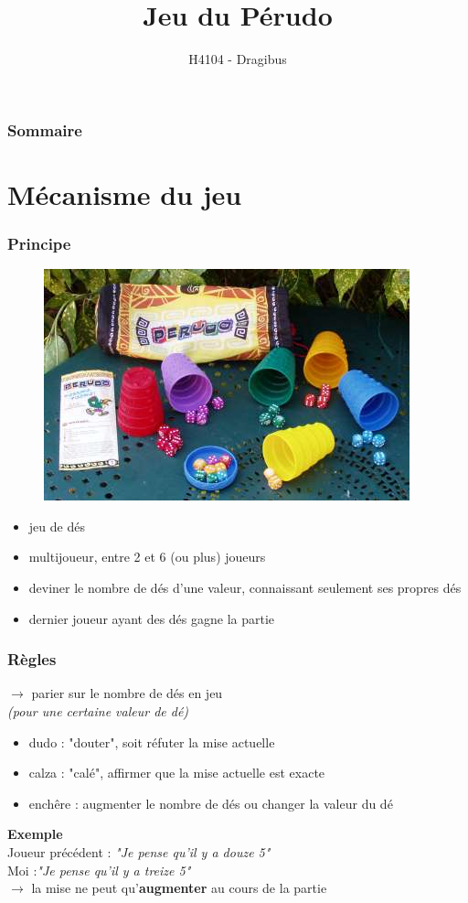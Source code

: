 \documentclass{beamer}
\title{Jeu du Pérudo}
\author{H4104 - Dragibus}
\institute{INSA de Lyon}
\begin{document}
\begin{frame}
  \titlepage
\end{frame}

\begin{frame}
  \frametitle{Sommaire}
  \tableofcontents[hideallsubsections]
\end{frame}

\section{Mécanisme du jeu}

\begin{frame}
  \frametitle{Principe}

  \begin{figure}
    \includegraphics[scale=0.4]{perudo}
  \end{figure}

  \begin{itemize}
    \item jeu de dés
    \item multijoueur, entre 2 et 6 (ou plus) joueurs
    \item deviner le nombre de dés d'une valeur, connaissant seulement ses
      propres dés
    \item dernier joueur ayant des dés gagne la partie
  \end{itemize}
\end{frame}

\begin{frame}
  \frametitle{Règles}
  $\to$ parier sur le nombre de dés en jeu \\
  \emph{(pour une certaine valeur de dé)}

  \begin{itemize}
    \item dudo : "douter", soit réfuter la mise actuelle
    \item calza : "calé", affirmer que la mise actuelle est exacte
    \item enchêre : augmenter le nombre de dés ou changer la valeur du dé
  \end{itemize}

  \textbf{Exemple}
  \\
  Joueur précédent : \textit{"Je pense qu'il y a douze 5"}
  \\
  Moi :\textit{"Je pense qu'il y a treize 5"}
  \\[5mm]
  $\to$ la mise ne peut qu'\textbf{augmenter} au cours de la partie
\end{frame}
\end{document}
